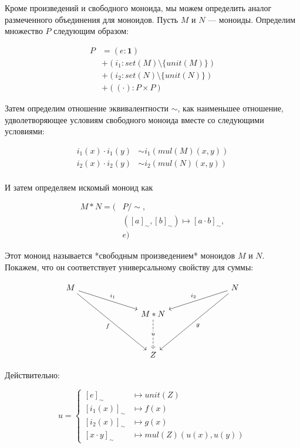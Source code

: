 \documentclass[10pt, a4paper]{article}
\theoremstyle{colon}
\begin{document}
Кроме произведений и свободного моноида, мы можем определить аналог размеченного объединения для моноидов.
Пусть \( M \) и \( N \) — моноиды. Определим множество \( P \)
следующим образом:

\begin{align*}
P &= (e : \bm 1) \\
{} &+ (i_1 : set(M) \setminus \{ unit(M)\}) \\
{} &+ (i_2 : set(N) \setminus \{ unit(N)\}) \\
{} &+ ((\cdot) : P \times P)
\end{align*}

Затем определим отношение эквивалентности \( \sim \), как наименьшее отношение,
удволетворяющее условиям свободного моноида вместе со следующими условиями:

\begin{align*}
i_1(x) \cdot i_1(y) &\sim i_1(mul(M)(x, y)) \\
i_2(x) \cdot i_2(y) &\sim i_2(mul(N)(x, y)) \\
\end{align*}

И затем определяем искомый моноид как

\begin{align*}
M * N = (
  &P/{\sim},\\
  &([a]_\sim, [b]_\sim) \mapsto [a \cdot b]_\sim,\\
  &e
)
\end{align*}

Этот моноид называется *свободным произведением* моноидов \( M \) и \( N \). Покажем, что он соответствует универсальному свойству для суммы:

\[\begin{tikzcd}
	M &&&&&& N \\
	&&& {M*N} \\
	\\
	&&& Z
	\arrow["{i_1}", from=1-1, to=2-4]
	\arrow["{i_2}"', from=1-7, to=2-4]
	\arrow["f"', from=1-1, to=4-4]
	\arrow["g", from=1-7, to=4-4]
	\arrow["u"{description}, dashed, from=2-4, to=4-4]
\end{tikzcd}\]

Действительно:

\[
u = \begin{cases}
[e]_\sim &\mapsto unit(Z) \\
[i_1(x)]_\sim &\mapsto f(x) \\
[i_2(x)]_\sim &\mapsto g(x) \\
[x \cdot y]_\sim &\mapsto mul(Z)(u(x), u(y))
\end{cases}
\]
\end{document}
